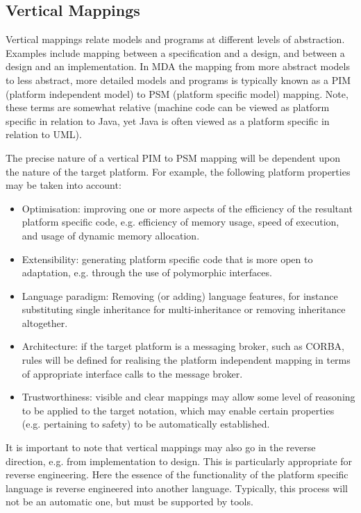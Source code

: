 \subsection{Vertical Mappings}

Vertical mappings relate models and programs at different levels
of abstraction. Examples include mapping between a specification
and a design, and between a design and an implementation. In MDA
the mapping from more abstract models to less abstract, more
detailed models and programs is typically known as a PIM (platform
independent model) to PSM (platform specific model) mapping. Note,
these terms are somewhat relative (machine code can be viewed as
platform specific in relation to Java, yet Java is often viewed as
a platform specific in relation to UML).

The precise nature of a vertical PIM to PSM mapping will be
dependent upon the nature of the target platform. For example, the
following platform properties may be taken into account:

\begin{itemize}
\item Optimisation: improving one or more aspects of the efficiency
of the resultant platform specific code, e.g. efficiency of memory
usage, speed of execution, and usage of dynamic memory allocation.
\item Extensibility: generating platform specific code that
is more open to adaptation, e.g. through the use of polymorphic
interfaces.
\item Language paradigm: Removing (or adding) language features,
for instance substituting single inheritance for multi-inheritance
or removing inheritance altogether.
\item Architecture: if the target platform is a messaging broker,
such as CORBA, rules will be defined for realising the platform
independent mapping in terms of appropriate interface calls to the
message broker.
\item Trustworthiness: visible and clear mappings may allow some
level of reasoning to be applied to the target notation, which may
enable certain properties (e.g. pertaining to safety) to be
automatically established.
\end{itemize}

It is important to note that vertical mappings may also go in the
reverse direction, e.g. from implementation to design. This is
particularly appropriate for reverse engineering. Here the essence
of the functionality of the platform specific language is reverse
engineered into another language. Typically, this process will not
be an automatic one, but must be supported by tools.

